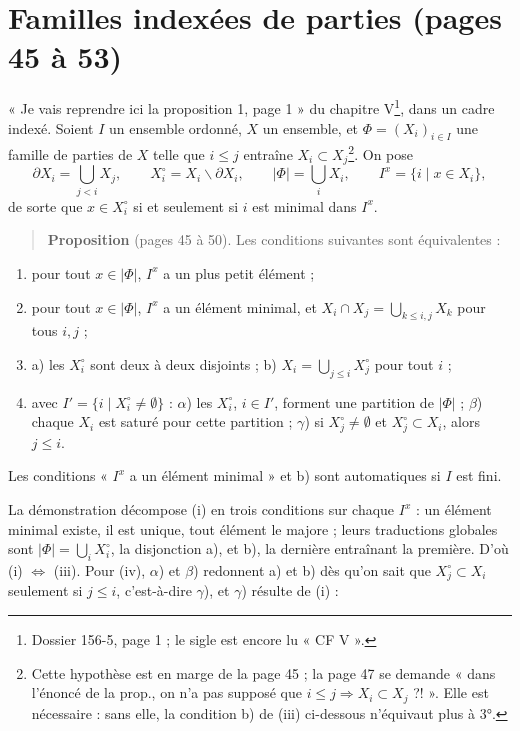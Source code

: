 \documentclass[11pt,a4paper]{article}
\begin{document}
\section*{Familles indexées de parties (pages 45 à 53)}

« Je vais reprendre ici la proposition 1, page 1 » du chapitre V\footnote{Dossier
156-5, page 1 ; le sigle est encore lu « CF V ».}, dans un cadre indexé. Soient
$I$ un ensemble ordonné, $X$ un ensemble, et $\Phi = (X_{i})_{i \in I}$ une
famille de parties de $X$ telle que $i \leq j$ entraîne $X_{i} \subset
X_{j}$\footnote{Cette hypothèse est en marge de la page 45 ; la page 47 se
demande « dans l'énoncé de la prop., on n'a pas supposé que $i \leq j
\Rightarrow X_{i} \subset X_{j}$ ?! ». Elle est nécessaire : sans elle, la
condition b) de (iii) ci-dessous n'équivaut plus à 3°.}. On pose
\[
\partial X_{i} = \bigcup_{j < i} X_{j}, \qquad X_{i}^{\circ} = X_{i}
\smallsetminus \partial X_{i}, \qquad |\Phi| = \bigcup_{i} X_{i}, \qquad
I^{x} = \{i \mid x \in X_{i}\},
\]
de sorte que $x \in X_{i}^{\circ}$ si et seulement si $i$ est minimal dans
$I^{x}$.

\begin{quote}
\textbf{Proposition} (pages 45 à 50). Les conditions suivantes sont
équivalentes :
\end{quote}
\begin{enumerate}
\item[(i)] pour tout $x \in |\Phi|$, $I^{x}$ a un plus petit élément ;
\item[(ii)] pour tout $x \in |\Phi|$, $I^{x}$ a un élément minimal, et $X_{i}
\cap X_{j} = \bigcup_{k \leq i, j} X_{k}$ pour tous $i, j$ ;
\item[(iii)] a) les $X_{i}^{\circ}$ sont deux à deux disjoints ; b) $X_{i} =
\bigcup_{j \leq i} X_{j}^{\circ}$ pour tout $i$ ;
\item[(iv)] avec $I' = \{i \mid X_{i}^{\circ} \neq \emptyset\}$ : $\alpha$) les
$X_{i}^{\circ}$, $i \in I'$, forment une partition de $|\Phi|$ ; $\beta$)
chaque $X_{i}$ est saturé pour cette partition ; $\gamma$) si $X_{j}^{\circ}
\neq \emptyset$ et $X_{j}^{\circ} \subset X_{i}$, alors $j \leq i$.
\end{enumerate}
Les conditions « $I^{x}$ a un élément minimal » et b) sont automatiques si $I$
est fini.


La démonstration décompose (i) en trois conditions sur chaque $I^{x}$ : un
élément minimal existe, il est unique, tout élément le majore ; leurs
traductions globales sont $|\Phi| = \bigcup_{i} X_{i}^{\circ}$, la disjonction
a), et b), la dernière entraînant la première. D'où (i) $\iff$ (iii). Pour (iv),
$\alpha$) et $\beta$) redonnent a) et b) dès qu'on sait que $X_{j}^{\circ}
\subset X_{i}$ seulement si $j \leq i$, c'est-à-dire $\gamma$), et $\gamma$)
résulte de (i) :
\end{document}
